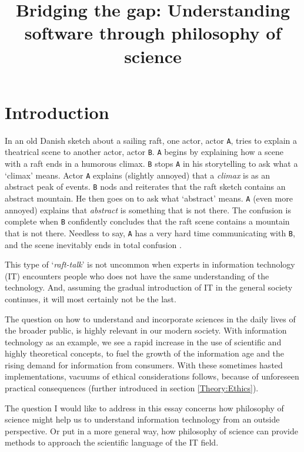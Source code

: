 \documentclass{article}
\title{Bridging the gap: Understanding software through philosophy of science}
\begin{document}


\maketitle

\tableofcontents

\pagebreak

\section{Introduction}
In an old Danish sketch about a sailing raft, one actor, actor \texttt{A}, tries to explain a theatrical scene to another actor, actor \texttt{B}. \texttt{A} begins by explaining how a scene with a raft ends in a humorous climax. \texttt{B} stops \texttt{A} in his storytelling to ask what a `climax' means. Actor \texttt{A} explains (slightly annoyed) that a \textit{climax} is as an abstract peak of events. \texttt{B} nods and reiterates that the raft sketch contains an abstract mountain. 
He then goes on to ask what `abstract' means. \texttt{A} (even more annoyed) explains that \textit{abstract} is something that is not there. The confusion is complete when \texttt{B} confidently concludes that the raft scene contains a mountain that is not there. Needless to say, \texttt{A} has a very hard time communicating with \texttt{B}, and the scene inevitably ends in total confusion \citep{Raft:2014}.

This type of `\textit{raft-talk}' is not uncommon when experts in information technology (IT) encounters people who does not have the same understanding of the technology. And, assuming the gradual introduction of IT in the general society continues, it will most certainly not be the last. 

The question on how to understand and incorporate sciences in the daily lives of the broader public, is highly relevant in our modern society. With information technology as an example, we see a rapid increase in the use of scientific and highly theoretical concepts, to fuel the growth of the information age and the rising demand for information from consumers. With these sometimes hasted implementations, vacuums of ethical considerations follows, because of unforeseen practical consequences \cite{Moor:1985} (further introduced in section \ref{Theory:Ethics}). 

The question I would like to address in this essay concerns how philosophy of science might help us to understand information technology from an outside perspective. Or put in a more general way, how philosophy of science can provide methods to approach the scientific language of the IT field.
\end{document}
